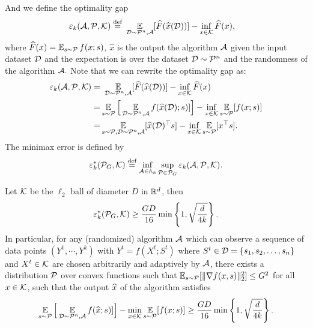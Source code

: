 And we define the optimality gap
\begin{align*}
    \varepsilon_k(\mathcal A,\mathcal P,\mathcal K)\stackrel{{\text{def}}}{=}&~ \operatorname*{\mathbb{E}}_{\mathcal D\sim\mathcal P^n,\mathcal A}[\widehat{F}(\widehat{x}(\mathcal D))]-\inf_{x\in \mathcal K}\widehat{F}(x),
\end{align*}
where $\widehat{F}(x) = \operatorname*{\mathbb{E}}_{s\sim\mathcal P} f(x; s)$, $\hat{x}$ is the output the algorithm $\mathcal A$ given the input dataset $\mathcal D$ and the expectation is over the dataset $\mathcal D\sim \mathcal P^n$ and the randomness of the algorithm $\mathcal A.$ Note that we can rewrite the optimality gap as:
\begin{align*}
    \varepsilon_k(\mathcal A,\mathcal P,\mathcal K)=&~ \operatorname*{\mathbb{E}}_{\mathcal D\sim\mathcal P^n,\mathcal A}[\widehat{F}(\widehat{x}(\mathcal D))]-\inf_{x\in \mathcal K}\widehat{F}(x)\\
    =& \operatorname*{\mathbb{E}}_{s\sim\mathcal P}\Big[\operatorname*{\mathbb{E}}_{\mathcal D\sim\mathcal P^n,\mathcal A}f(\widehat{x}(\mathcal D);s)]\Big]-\inf_{x\in\mathcal K}\operatorname*{\mathbb{E}}_{s\sim\mathcal P}[f(x;s)]\\
    =& \operatorname*{\mathbb{E}}_{s\sim\mathcal P,\mathcal D\sim\mathcal P^n,\mathcal A}[\widehat{x}(\mathcal D)^\top s]-\inf_{x\in\mathcal K}\operatorname*{\mathbb{E}}_{s\sim \mathcal P}[x^\top s].
\end{align*}
The minimax error is defined by
\begin{align*}
    \varepsilon_k^*(\mathcal P_G,\mathcal K)\stackrel{{\text{def}}}{=} \inf_{\mathcal A\in \mathbb{A}_k}\sup_{\mathcal{P}\in \mathcal P_G}\varepsilon_k(\mathcal A,\mathcal P,\mathcal K).
\end{align*}

\begin{theorem}
\label{thm:info_bound}
Let $\mathcal K$ be the $\ell_2$ ball of diameter $D$ in $\mathbb{R}^d$, then
\begin{align*}
    \varepsilon_k^*(\mathcal P_G,\mathcal K)\geq \frac{GD}{16}\min\left\{1,\sqrt{\frac{d}{4k}}\right\}.
\end{align*}
In particular, for any (randomized) algorithm $\mathcal A$ which can observe a sequence of data points $(Y^1,\cdots,Y^k)$ with $Y^t=f(X^t;S^t)$ where $S^t\in\mathcal D=\{s_1,s_2,\dots,s_n\}$ and $X^t\in\mathcal K$ are chosen arbitrarily and adaptively by $\mathcal A$,
there exists a distribution $\mathcal P$ over convex functions such that $\operatorname*{\mathbb{E}}_{s\sim \mathcal{P}}[\|\nabla f(x,s)\|_2^2]\leq G^2$ for all $x\in \mathcal K$, such that the output $\widehat{x}$ of the algorithm satisfies
\begin{align*}
    \operatorname*{\mathbb{E}}_{s\sim\mathcal P}\Big[ \operatorname*{\mathbb{E}}_{\mathcal D\sim\mathcal P^n,\mathcal A}f(\widehat{x};s)]\Big]-\min_{x\in\mathcal K}\operatorname*{\mathbb{E}}_{s\sim\mathcal P}[f(x;s)]\geq \frac{GD}{16}\min\left\{1,\sqrt{\frac{d}{4k}}\right\}.
\end{align*}
\end{theorem}


